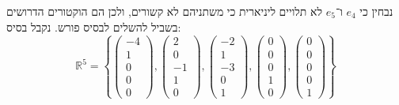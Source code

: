 \documentclass[]{article}
\newcommand\R     {\mathbb{R}}
\newcommand\pms[1]    {\begin{pmatrix}
		#1
\end{pmatrix}}
\newcommand\ccb[1]    {\left \{ #1 \right \}}
\begin{document}
	 נבחין כי $e_4$ ו־$e_5$ לא תלויים ליניארית כי משתניהם לא קשורים, ולכן הם הוקטורים הדרושים בשביל להשלים לבסיס פורש. נקבל בסיס: 
	 \[ \R^5 = \ccb{\pms{-4 \\ 1 \\ 0 \\ 0 \\ 0}, \pms{2 \\ 0 \\ -1 \\ 1 \\ 0}, \pms{-2 \\ 1 \\ -3 \\ 0 \\ 1}, \pms{0 \\ 0 \\ 0 \\ 1 \\ 0}, \pms{0 \\ 0 \\ 0 \\ 0 \\ 1}} \]
	
	
\end{document}
